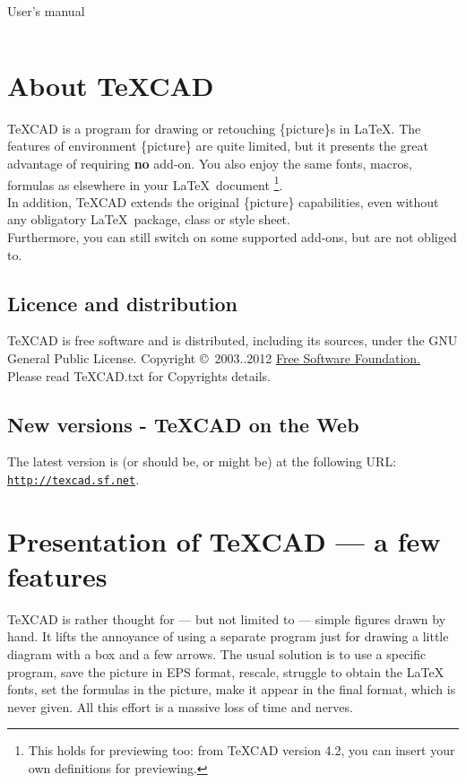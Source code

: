 \documentclass[11pt,a4paper]{article}
\begin{document}
%
\parindent 0pt
%
\def\TC{{\TeX}CAD}
%
\begin{center}
% 
{\sf {\Huge \TC} {\LARGE User's manual}}
\end{center}
%
\def\bs{$\backslash$}
\def\hrefid#1{\href{#1}{{\tt {\small #1}}}}
%
$$ $$
%
\section{About {\TC}}
%
  {\TC} is a program for drawing or retouching \{picture\}s in \LaTeX.
  The features of environment \{picture\} are quite limited, but it
  presents the great advantage of requiring {\bf no} add-on.
  You also enjoy the same fonts, macros, formulas as elsewhere
  in your \LaTeX \, document
  \footnote{This holds for previewing too: from {\TC} version 4.2,
  you can insert your own definitions for previewing.}.
  \\
  In addition, {\TC} extends the original \{picture\} capabilities,
  even without any obligatory \LaTeX \, package, class or style sheet.\\
  Furthermore, you can still switch on some supported add-ons, but are not obliged to.\\

%

\subsection{Licence and distribution}
%
    {\TC} is free software and is distributed, including its sources,
    under the GNU General Public License.
    Copyright \copyright \, 2003..2012
    \href{http://www.fsf.org/}{Free Software Foundation.}
    Please read {\TC}.txt for Copyrights details.
%
\subsection{New versions - {\TC} on the Web}
%
The latest version is (or should be, or might be) at the following URL:
\hrefid{http://texcad.sf.net}.

\section{Presentation of {{\TC}} --- a few features}
%
{{\TC}} is rather thought for --- but
not limited to --- simple figures drawn by hand.
It lifts the annoyance of using a separate program
just for drawing a little diagram with a box and a few arrows.
The usual solution is
to use a specific program, save the picture in EPS format, rescale,
struggle to obtain
the \LaTeX\, fonts, set the formulas in the picture, make it appear
in the final format, which is never given. All this effort is a
massive loss of time and nerves.
\end{document}
